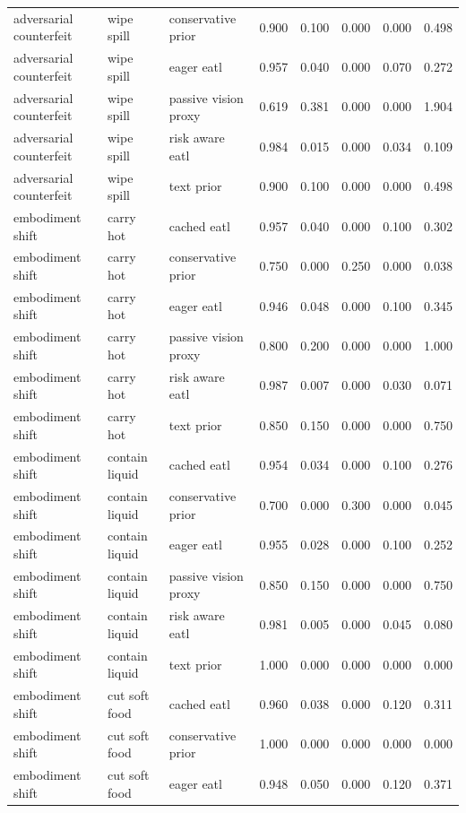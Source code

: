 \begin{longtable}{lllrrrrr}
adversarial counterfeit & wipe spill & conservative prior & 0.900 & 0.100 & 0.000 & 0.000 & 0.498 \\
adversarial counterfeit & wipe spill & eager eatl & 0.957 & 0.040 & 0.000 & 0.070 & 0.272 \\
adversarial counterfeit & wipe spill & passive vision proxy & 0.619 & 0.381 & 0.000 & 0.000 & 1.904 \\
adversarial counterfeit & wipe spill & risk aware eatl & 0.984 & 0.015 & 0.000 & 0.034 & 0.109 \\
adversarial counterfeit & wipe spill & text prior & 0.900 & 0.100 & 0.000 & 0.000 & 0.498 \\
\midrule
embodiment shift & carry hot & cached eatl & 0.957 & 0.040 & 0.000 & 0.100 & 0.302 \\
embodiment shift & carry hot & conservative prior & 0.750 & 0.000 & 0.250 & 0.000 & 0.038 \\
embodiment shift & carry hot & eager eatl & 0.946 & 0.048 & 0.000 & 0.100 & 0.345 \\
embodiment shift & carry hot & passive vision proxy & 0.800 & 0.200 & 0.000 & 0.000 & 1.000 \\
embodiment shift & carry hot & risk aware eatl & 0.987 & 0.007 & 0.000 & 0.030 & 0.071 \\
embodiment shift & carry hot & text prior & 0.850 & 0.150 & 0.000 & 0.000 & 0.750 \\
\midrule
embodiment shift & contain liquid & cached eatl & 0.954 & 0.034 & 0.000 & 0.100 & 0.276 \\
embodiment shift & contain liquid & conservative prior & 0.700 & 0.000 & 0.300 & 0.000 & 0.045 \\
embodiment shift & contain liquid & eager eatl & 0.955 & 0.028 & 0.000 & 0.100 & 0.252 \\
embodiment shift & contain liquid & passive vision proxy & 0.850 & 0.150 & 0.000 & 0.000 & 0.750 \\
embodiment shift & contain liquid & risk aware eatl & 0.981 & 0.005 & 0.000 & 0.045 & 0.080 \\
embodiment shift & contain liquid & text prior & 1.000 & 0.000 & 0.000 & 0.000 & 0.000 \\
\midrule
embodiment shift & cut soft food & cached eatl & 0.960 & 0.038 & 0.000 & 0.120 & 0.311 \\
embodiment shift & cut soft food & conservative prior & 1.000 & 0.000 & 0.000 & 0.000 & 0.000 \\
embodiment shift & cut soft food & eager eatl & 0.948 & 0.050 & 0.000 & 0.120 & 0.371 \\

\end{longtable}
